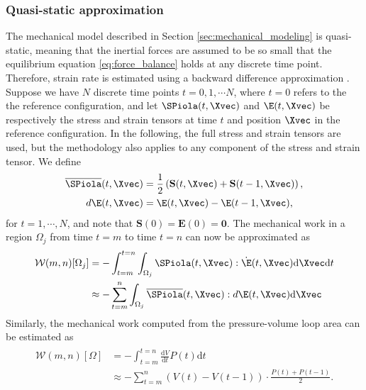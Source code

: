 \subsubsection{Quasi-static approximation}
The mechanical model described in Section
\ref{sec:mechanical_modeling} is quasi-static, meaning that the
inertial forces are assumed to be so small that the
equilibrium equation \eqref{eq:force_balance} holds at any discrete
time point. Therefore, strain rate is estimated using a
backward difference approximation \cite{wang2011myocardial}.
Suppose we have $N$ discrete time points $t = 0,1, \cdots N$, where $ t = 0$
refers to the the reference configuration, and let $\SPiola(t, \Xvec)$
and $\E(t, \Xvec)$ be respectively the stress and strain tensors at
time $t$ and position $\Xvec$ in the reference configuration. In the
following, the full stress and strain tensors are used, but the methodology
also applies to any component of the stress and strain tensor. We define
\begin{align}
  \overline{\SPiola}(t,\Xvec) &= \frac{1}{2}\left( \mathbf{S}(t,\Xvec) + \mathbf{S}(t-1,\Xvec) \right),\\
  d\E(t,\Xvec) &= \E(t,\Xvec) - \E(t-1,\Xvec),
\end{align}
for $t = 1,\cdots, N$, and note that $ \mathbf{S}(0) = \mathbf{E}(0) = \mathbf{0}$.
The mechanical work in a region $\Omega_j$ from time $t=m$ to time $t=n$ can now be approximated
as 
\begin{align}
  \begin{split}
   \mathcal{W}(m, n)[\Omega_j]
  &= -\int_{t=m}^{t=n} \int_{\Omega_j}\SPiola(t, \Xvec) : \dot{\E}(t, \Xvec) \mathrm{d}\Xvec \mathrm{d}t \\
  &\approx - \sum_{t = m}^{n}\int_{\Omega_j}\overline{\SPiola}(t, \Xvec) : d\E(t, \Xvec) \mathrm{d}\Xvec
  \end{split}
\label{eq:total_work}
\end{align}
Similarly, the mechanical work computed from the pressure-volume loop area can be estimated as  
\begin{align}
  \begin{split}
  \mathcal{W}(m,n)[\Omega]
  &= - \int_{t=m}^{t=n} \frac{\mathrm{d}V}{\mathrm{d}t} P(t) \mathrm{d}t \\
  &\approx -\sum_{t = m}^{n}  (V(t) - V(t-1)) \cdot \frac{P(t) + P(t-1)}{2}.
  \end{split}
\end{align}


